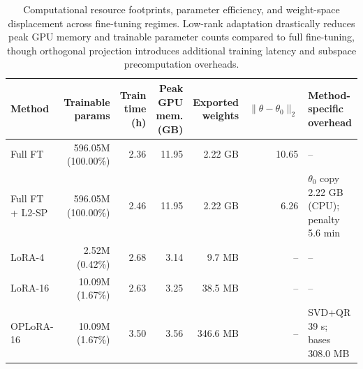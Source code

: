 \begin{table}[t]
\centering
\small
\caption{Computational resource footprints, parameter efficiency, and weight-space displacement across fine-tuning regimes. Low-rank adaptation drastically reduces peak GPU memory and trainable parameter counts compared to full fine-tuning, though orthogonal projection introduces additional training latency and subspace precomputation overheads.}
\label{tab:t1-resources}
\begin{tabular}{lrrrrrl}
\toprule
Method & \makecell{Trainable\\params} & \makecell{Train\\time (h)} & \makecell{Peak GPU\\mem. (GB)} & \makecell{Exported\\weights} & $\|\theta-\theta_0\|_2$ & Method-specific overhead \\
\midrule
Full FT & 596.05M (100.00\%) & 2.36 & 11.95 & 2.22 GB & 10.65 & – \\
Full FT + L2-SP & 596.05M (100.00\%) & 2.46 & 11.95 & 2.22 GB & 6.26 & $\theta_0$ copy 2.22 GB (CPU); penalty 5.6 min \\
LoRA-4 & 2.52M (0.42\%) & 2.68 & 3.14 & 9.7 MB & – & – \\
LoRA-16 & 10.09M (1.67\%) & 2.63 & 3.25 & 38.5 MB & – & – \\
OPLoRA-16 & 10.09M (1.67\%) & 3.50 & 3.56 & 346.6 MB & – & SVD+QR 39 s; bases 308.0 MB \\
\bottomrule
\end{tabular}
\end{table}
